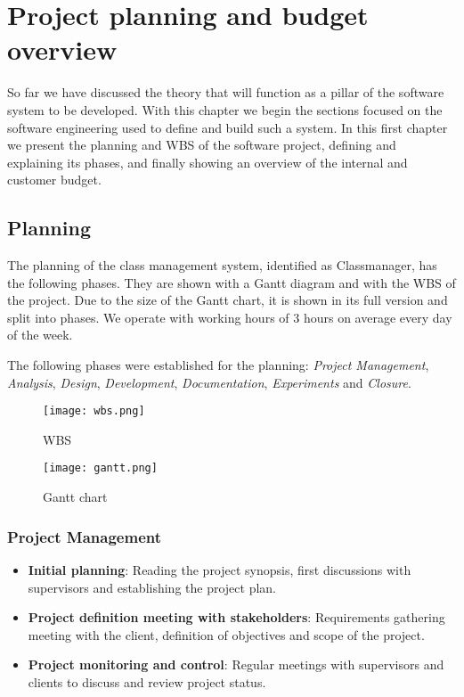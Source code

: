 \renewcommand{\documentname}{Project planning and budget overview}

\chapter{Project planning and budget overview}

So far we have discussed the theory that will function as a pillar of the software system to be developed. With this chapter we begin the sections focused on the software engineering used to define and build such a system. In this first chapter we present the planning and WBS of the software project, defining and explaining its phases, and finally showing an overview of the internal and customer budget.


\section{Planning}

The planning of the class management system, identified as Classmanager, has the following phases. They are shown with a Gantt diagram and with the WBS of the project. Due to the size of the Gantt chart, it is shown in its full version and split into phases. We operate with working hours of 3 hours on average every day of the week. 

The following phases were established for the planning: \textit{Project Management}, \textit{Analysis}, \textit{Design}, \textit{Development}, \textit{Documentation}, \textit{Experiments} and \textit{Closure}.


\begin{figure}[H]
    \caption{WBS}
  \centering
  \texttt{[image: wbs.png]}
\end{figure}


\begin{figure}[H]
    \caption{Gantt chart}
  \centering
  \texttt{[image: gantt.png]}
\end{figure}


\subsection{Project Management}

\begin{itemize}
    \item \textbf{Initial planning}: Reading the project synopsis, first discussions with supervisors and establishing the project plan. 
    \item \textbf{Project definition meeting with stakeholders}: Requirements gathering meeting with the client, definition of objectives and scope of the project.
    \item \textbf{Project monitoring and control}: Regular meetings with supervisors and clients to discuss and review project status. 
\end{itemize}

